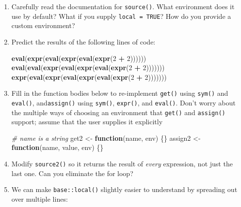 \documentclass[]{book}
\newenvironment{Shaded}{\begin{snugshade}}{\end{snugshade}}
\newcommand{\CommentTok}[1]{\textcolor[rgb]{0.37,0.37,0.37}{\textit{#1}}}
\newcommand{\ControlFlowTok}[1]{\textcolor[rgb]{0.27,0.27,0.27}{\textbf{#1}}}
\newcommand{\DecValTok}[1]{\textcolor[rgb]{0.06,0.06,0.06}{#1}}
\newcommand{\KeywordTok}[1]{\textcolor[rgb]{0.27,0.27,0.27}{\textbf{#1}}}
\newcommand{\NormalTok}[1]{#1}
\newcommand{\OperatorTok}[1]{\textcolor[rgb]{0.43,0.43,0.43}{\textbf{#1}}}
\newcommand{\StringTok}[1]{\textcolor[rgb]{0.5,0.5,0.5}{#1}}
\begin{document}
\begin{enumerate}
\def\labelenumi{\arabic{enumi}.}
\item
  Carefully read the documentation for \texttt{source()}. What environment does it
  use by default? What if you supply \texttt{local\ =\ TRUE}? How do you provide
  a custom environment?
\item
  Predict the results of the following lines of code:

\begin{Shaded}
\begin{Highlighting}[]
\KeywordTok{eval}\NormalTok{(}\KeywordTok{expr}\NormalTok{(}\KeywordTok{eval}\NormalTok{(}\KeywordTok{expr}\NormalTok{(}\KeywordTok{eval}\NormalTok{(}\KeywordTok{expr}\NormalTok{(}\DecValTok{2} \OperatorTok{+}\StringTok{ }\DecValTok{2}\NormalTok{))))))}
\KeywordTok{eval}\NormalTok{(}\KeywordTok{eval}\NormalTok{(}\KeywordTok{expr}\NormalTok{(}\KeywordTok{eval}\NormalTok{(}\KeywordTok{expr}\NormalTok{(}\KeywordTok{eval}\NormalTok{(}\KeywordTok{expr}\NormalTok{(}\DecValTok{2} \OperatorTok{+}\StringTok{ }\DecValTok{2}\NormalTok{)))))))}
\KeywordTok{expr}\NormalTok{(}\KeywordTok{eval}\NormalTok{(}\KeywordTok{expr}\NormalTok{(}\KeywordTok{eval}\NormalTok{(}\KeywordTok{expr}\NormalTok{(}\KeywordTok{eval}\NormalTok{(}\KeywordTok{expr}\NormalTok{(}\DecValTok{2} \OperatorTok{+}\StringTok{ }\DecValTok{2}\NormalTok{)))))))}
\end{Highlighting}
\end{Shaded}
\item
  Fill in the function bodies below to re-implement \texttt{get()} using \texttt{sym()}
  and \texttt{eval()}, and\texttt{assign()} using \texttt{sym()}, \texttt{expr()}, and \texttt{eval()}. Don't
  worry about the multiple ways of choosing an environment that \texttt{get()} and
  \texttt{assign()} support; assume that the user supplies it explicitly

\begin{Shaded}
\begin{Highlighting}[]
\CommentTok{# name is a string}
\NormalTok{get2 <-}\StringTok{ }\ControlFlowTok{function}\NormalTok{(name, env) \{\}}
\NormalTok{assign2 <-}\StringTok{ }\ControlFlowTok{function}\NormalTok{(name, value, env) \{\}}
\end{Highlighting}
\end{Shaded}
\item
  Modify \texttt{source2()} so it returns the result of \emph{every} expression,
  not just the last one. Can you eliminate the for loop?
\item
  We can make \texttt{base::local()} slightly easier to understand by spreading
  out over multiple lines:


\end{enumerate}
\end{document}

